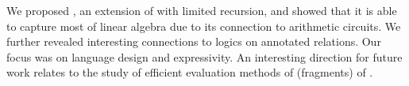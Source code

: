 We proposed \langfor, an extension of \lang with limited recursion,
and showed that it is able to capture most of linear algebra due to its
connection to arithmetic circuits. We further revealed interesting connections
to logics on annotated relations. Our focus was on language design and
expressivity. An interesting direction for future work relates to the study of 
efficient evaluation methods of (fragments) of \langfor. 

